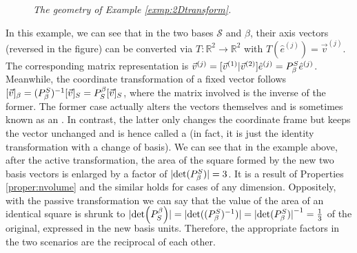 \begin{solution}
\begin{figure}[t!]
\caption{\textit{The geometry of Example \ref{exmp:2Dtransform}.}}
\label{fig:coordtransgeo}
\end{figure}
\end{solution}
In this example, we can see that in the two bases $\mathcal{S}$ and $\mathcal{\beta}$, their axis vectors (reversed in the figure) can be converted via $T: \mathbb{R}^2 \to \mathbb{R}^2$ with $T(\hat{e}^{(j)}) = \vec{v}^{(j)}$. The corresponding matrix representation is $\vec{v}^{(j)} = [\vec{v}^{(1)}|\vec{v}^{(2)}]\hat{e}^{(j)} = \smash{P_\beta^S}\hat{e}^{(j)}$. Meanwhile, the coordinate transformation of a fixed vector follows $[\vec{v}]_\beta = \smash{(P_\beta^S)^{-1}}[\vec{v}]_S = \smash{P_S^\beta}[\vec{v}]_S$, where the matrix involved is the inverse of the former. The former case actually alters the vectors themselves and is sometimes known as an . In contrast, the latter only changes the coordinate frame but keeps the vector unchanged and is hence called a  (in fact, it is just the identity transformation with a change of basis). We can see that in the example above, after the active transformation, the area of the square formed by the new two basis vectors is enlarged by a factor of $\abs{\det(\smash{P_\beta^S})}=3$. It is a result of Properties \ref{proper:nvolume} and the similar holds for cases of any dimension. Oppositely, with the passive transformation we can say that the value of the area of an identical square is shrunk to $\abs{\smash{\det(P_S^\beta)}} = \abs{\det(\smash{(P_\beta^S)^{-1}})} = \abs{\det(\smash{P_\beta^S})}^{-1} = \frac{1}{3}$ of the original, expressed in the new basis units. Therefore, the appropriate factors in the two scenarios are the reciprocal of each other.

